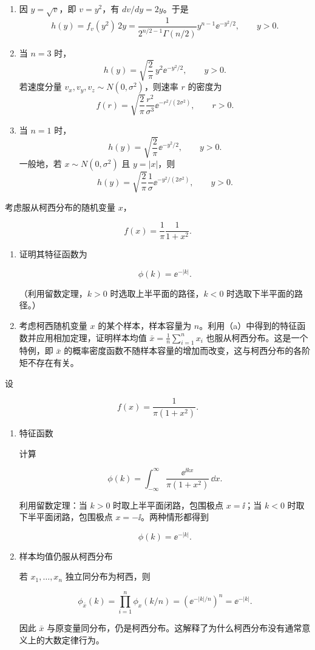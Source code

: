 \begin{question}
\begin{solution}
\begin{enumerate}
\item 因 \(y=\sqrt v\)，即 \(v=y^2\)，有 \(dv/dy=2y\)。于是
\[
h(y)=f_v(y^2)\,2y
=\frac{1}{2^{n/2-1}\Gamma(n/2)}y^{n-1}\ee^{-y^2/2},
\qquad y>0.
\]

\item 当 \(n=3\) 时，
\[
h(y)=\sqrt{\frac{2}{\pi}}\,y^2\ee^{-y^2/2},\qquad y>0.
\]
若速度分量 \(v_x,v_y,v_z\sim N(0,\sigma^2)\)，则速率 \(r\) 的密度为
\[
f(r)=\sqrt{\frac{2}{\pi}}\frac{r^2}{\sigma^3}\ee^{-r^2/(2\sigma^2)},\qquad r>0.
\]

\item 当 \(n=1\) 时，
\[
h(y)=\sqrt{\frac{2}{\pi}}\ee^{-y^2/2},\qquad y>0.
\]
一般地，若 \(x\sim N(0,\sigma^2)\) 且 \(y=|x|\)，则
\[
h(y)=\sqrt{\frac{2}{\pi}}\frac1{\sigma}\ee^{-y^2/(2\sigma^2)},\qquad y>0.
\]
\end{enumerate}
\end{solution}
\end{question}


\begin{question}
考虑服从柯西分布的随机变量 \(x\)，

\[
f(x)=\frac{1}{\pi}\frac{1}{1+x^2}.
\]

\begin{enumerate}
\item 证明其特征函数为

\[
\phi(k)=\ee^{-|k|}.
\]

（利用留数定理，\(k>0\) 时选取上半平面的路径，\(k<0\)
时选取下半平面的路径。）

\item 考虑柯西随机变量 \(x\) 的某个样本，样本容量为
\(n\)。利用（a）中得到的特征函数并应用相加定理，证明样本均值
\(\bar x=\frac1n\sum_{i=1}^{n}x_i\) 也服从柯西分布。这是一个特例，即
\(\bar x\)
的概率密度函数不随样本容量的增加而改变，这与柯西分布的各阶矩不存在有关。
\end{enumerate}
\begin{solution}
设

\[
f(x)=\frac{1}{\pi(1+x^2)}.
\]

\begin{enumerate}
\item 特征函数

计算

\[
\phi(k)=\int_{-\infty}^{\infty}\frac{\ee^{\ii kx}}{\pi(1+x^2)}\,\dd{x}.
\]

利用留数定理：当 \(k>0\) 时取上半平面闭路，包围极点 \(x=\ii\)；当 \(k<0\)
时取下半平面闭路，包围极点 \(x=-\ii\)。两种情形都得到

\[
\phi(k)=\ee^{-|k|}.
\]

\item 样本均值仍服从柯西分布

若 \(x_1,\dots,x_n\) 独立同分布为柯西，则

\[
\phi_{\bar x}(k)
=\prod_{i=1}^n \phi_x(k/n)
=\left(\ee^{-|k|/n}\right)^n
=\ee^{-|k|}.
\]

因此 \(\bar x\)
与原变量同分布，仍是柯西分布。这解释了为什么柯西分布没有通常意义上的大数定律行为。
\end{enumerate}
\end{solution}
\end{question}


